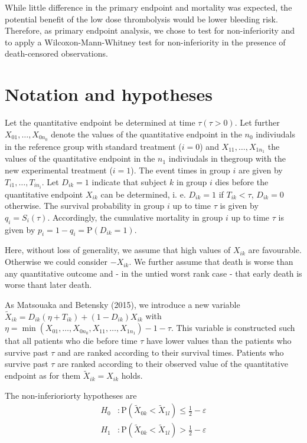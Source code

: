 \documentclass[bimj,fleqn]{w-art}\usepackage[]{graphicx}\usepackage[]{color}
\theoremstyle{plain}
\theoremstyle{definition}
\begin{document}
  While little difference in the primary endpoint and mortality was expected,
  the potential benefit of the low dose thrombolysis would be lower bleeding
  risk. Therefore, as primary endpoint analysis, we chose to test for
  non-inferiority and to apply a Wilcoxon-Mann-Whitney test for non-inferiority
  in the presence of death-censored observations.

  \section{Notation and hypotheses}
  \label{sec:Notation}
  Let the quantitative endpoint be determined at time $\tau (\tau > 0)$. Let
  further $X_{01}, \ldots, X_{0n_0}$ denote the values of the quantitative endpoint
  in the $n_0$ indiviudals in the reference group with standard treatment ($i=0$)
  and $X_{11}, \ldots, X_{1n_1}$ the values of the quantitative endpoint in the
  $n_1$ indiviudals in thegroup with the new experimental treatment ($i=1$).
  The event times in group $i$ are given by $T_{i1}, \ldots, T_{in_i}$. Let
  $D_{ik} = 1$ indicate that subject $k$ in group $i$ dies before the
  quantitative endpoint $X_{ik}$ can be determined, i. e. $D_{ik} = 1$ if
  $T_{ik} < \tau $, $D_{ik} = 0$ otherwise. The survival probability in group
  $i$ up to time $\tau$ is given by $q_i = S_i(\tau)$. Accordingly, the
  cumulative mortality in group $i$ up to time $\tau$ is given by
  $p_i = 1 - q_i = \text{P}(D_{ik} = 1)$.

  Here, without loss of generality, we assume that high values of $X_{ik}$ are
  favourable. Otherwise we could consider $-X_{ik}$. We further assume that
  death is worse than any quantitative outcome and - in the untied worst rank
  case - that early death is worse thant later death.

  As Matsouaka and Betensky (2015), we introduce a new variable
  $\widetilde{X}_{ik} = D_{ik}(\eta  + T_{ik}) + (1 - D_{ik})X_{ik}$ with
	$\eta = \min(X_{01}, \ldots, X_{0n_0}, X_{11}, \ldots, X_{1n_1}) - 1 - \tau$.
	This variable is constructed such that all patients who die before time $\tau$
	have lower values than the patients who survive past $\tau$ and are ranked
	according to their survival times. Patients who survive past $\tau$ are ranked
	according to their observed	value of the quantitative endpoint as for them
	$\widetilde{X}_{ik} = {X}_{ik}$ holds.

	The non-inferioriorty hypotheses are
  \begin{align*}
	H_0 &:  \text{P}(\widetilde{X}_{0k} < \widetilde{X}_{1l})
            \leq \frac{1}{2} - \varepsilon \\
  H_1 &:  \text{P}(\widetilde{X}_{0k} < \widetilde{X}_{1l})
            > \frac{1}{2} - \varepsilon
  \end{align*}
\end{document}
